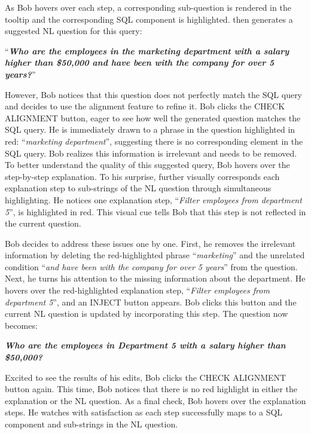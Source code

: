 As Bob hovers over each step, a corresponding sub-question is rendered in the tooltip and the corresponding SQL component is highlighted.
{\tool} then generates a suggested NL question for this query:
\begin{center}
``\textit{\textbf{Who are the employees in the marketing department with a salary higher than \$50,000 and have been with the company for over 5 years?}}''
\end{center}
However, Bob notices that this question does not perfectly match the SQL query and decides to use the alignment feature to refine it.
Bob clicks the CHECK ALIGNMENT button, eager to see how well the generated question matches the SQL query.
He is immediately drawn to a phrase in the question highlighted in red: ``\textit{marketing department}'', suggesting there is no corresponding element in the SQL query.
Bob realizes this information is irrelevant and needs to be removed.
To better understand the quality of this suggested query, Bob hovers over the step-by-step explanation. To his surprise, {\tool} further visually corresponds each explanation step to sub-strings of the NL question through simultaneous highlighting.
He notices one explanation step, ``\textit{Filter employees from department 5}'', is highlighted in red.
This visual cue tells Bob that this step is not reflected in the current question.

Bob decides to address these issues one by one. 
First, he removes the irrelevant information by deleting the red-highlighted phrase ``\textit{marketing}'' and the unrelated condition ``\textit{and have been with the company for over 5 years}'' from the question.
Next, he turns his attention to the missing information about the department. He hovers over the red-highlighted explanation step, ``{\em Filter employees from department 5}'', and an INJECT button appears. Bob clicks this button and the current NL question is updated by incorporating this step.
The question now becomes:
\begin{center}
\textit{\textbf{Who are the employees in Department 5 with a salary higher than \$50,000?}}
\end{center}
Excited to see the results of his edits, Bob clicks the CHECK ALIGNMENT button again. 
This time, Bob notices that there is no red highlight in either the explanation or the NL question.
As a final check, Bob hovers over the explanation steps. He watches with satisfaction as each step successfully maps to a SQL component and sub-strings in the NL question.


